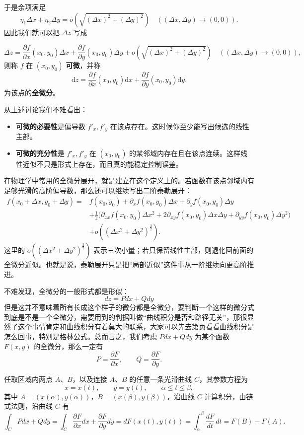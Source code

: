 \documentclass[UTF8]{ctexbook}
\begin{document}
于是余项满足
\[
  \eta_1\Delta x+\eta_2\Delta y=o\!\left(\sqrt{(\Delta x)^2+(\Delta y)^2}\right)
  \quad ((\Delta x,\Delta y)\to(0,0)).
\]
因此我们就可以把 $\Delta z$ 写成

\[
\Delta z=\frac{\partial f}{\partial x}(x_0,y_0)\Delta x+\frac{\partial f}{\partial y}(x_0,y_0)\Delta y+o\!\left(\sqrt{(\Delta x)^2+(\Delta y)^2}\right)
\quad((\Delta x,\Delta y)\to(0,0)),
\]
则称 $f$ 在 $(x_0,y_0)$ \textbf{可微}，并称
\[
\mathrm{d}z=\frac{\partial f}{\partial x}(x_0,y_0)\mathrm{d}x+\frac{\partial f}{\partial y}(x_0,y_0)\mathrm{d}y.
\]
为该点的\textbf{全微分}。

从上述讨论我们不难看出：
\begin{itemize}
  \item \textbf{可微的必要性}是偏导数 $f'_x,f'_y$ 在该点存在。这时候你至少能写出候选的线性主部。
  \item \textbf{可微的充分性}是 $f'_x,f'_y$ 在 $(x_0,y_0)$ 的某邻域内存在且在该点连续。这样线性近似不只是形式上存在，而且真的能稳定控制误差。
\end{itemize}

在物理学中常用的全微分展开，就是建立在这个定义上的。若函数在该点邻域内有足够光滑的高阶偏导数，那么还可以继续写出二阶泰勒展开：
\[
\begin{aligned}
f(x_0+\Delta x,y_0+\Delta y)
={}&f(x_0,y_0)+\partial_x f(x_0,y_0)\Delta x+\partial_y f(x_0,y_0)\Delta y\\
&+\frac12\bigl(\partial_{xx}f(x_0,y_0)\Delta x^2+2\partial_{xy}f(x_0,y_0)\Delta x\Delta y+\partial_{yy}f(x_0,y_0)\Delta y^2\bigr)\\
&+o\!\left((\Delta x^2+\Delta y^2)^{\frac32}\right).
\end{aligned}
\]
这里的 $o\!\left((\Delta x^2+\Delta y^2)^{\frac32}\right)$ 表示三次小量；若只保留线性主部，则退化回前面的全微分近似。也就是说，泰勒展开只是把“局部近似”这件事从一阶继续向更高阶推进。


不难发现，全微分的一般形式都是形似：
\[
dz=Pdx+Qdy
\]
但是这并不意味着所有长成这个样子的微分都是全微分，要判断一个这样的微分式到底是不是一个全微分，需要用到的判据叫做“曲线积分是否和路径无关”，那很显然了这个事情肯定和曲线积分有着莫大的联系，大家可以先去第\pageref{path-independent}页看看曲线积分是怎么回事，特别是格林公式。总而言之，我们考虑 $Pdx+Qdy$ 为某个函数 $F(x,y)$ 的全微分，那么一定有
\[
P=\frac{\partial F}{\partial x},\qquad Q=\frac{\partial F}{\partial y}.
\]

任取区域内两点 $A$、$B$，以及连接 $A$、$B$ 的任意一条光滑曲线 $C$，其参数方程为
\[
x=x(t),\qquad y=y(t),\qquad \alpha\leq t\leq \beta,
\]
其中 $A=(x(\alpha),y(\alpha))$，$B=(x(\beta),y(\beta))$，沿曲线 $C$ 计算积分，由链式法则，沿曲线 $C$ 有
\[
\int_C Pdx+Qdy
=\int_C \frac{\partial F}{\partial x}dx+\frac{\partial F}{\partial y}dy
=dF(x(t),y(t))
=\int_\alpha^\beta \frac{dF}{dt}\,dt
=F(B)-F(A).
\]
\end{document}

